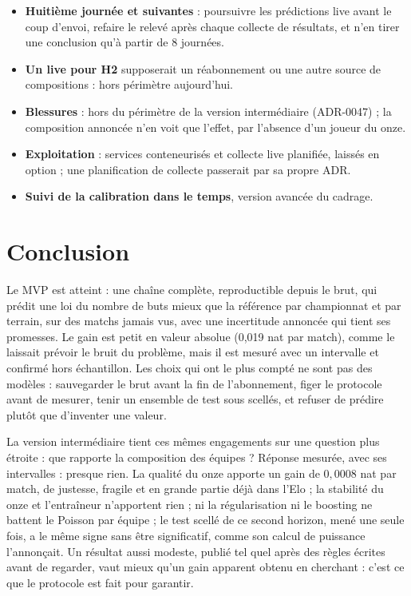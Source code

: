 \begin{itemize}
  \item \textbf{Huitième journée et suivantes} : poursuivre les prédictions live avant le coup d'envoi,
        refaire le relevé après chaque collecte de résultats, et n'en tirer une conclusion qu'à partir de
        8 journées.
  \item \textbf{Un live pour H2} supposerait un réabonnement ou une autre source de compositions : hors
        périmètre aujourd'hui.
  \item \textbf{Blessures} : hors du périmètre de la version intermédiaire (ADR-0047) ; la composition
        annoncée n'en voit que l'effet, par l'absence d'un joueur du onze.
  \item \textbf{Exploitation} : services conteneurisés et collecte live planifiée, laissés en option ; une
        planification de collecte passerait par sa propre ADR.
  \item \textbf{Suivi de la calibration dans le temps}, version avancée du cadrage.
\end{itemize}

\section{Conclusion}

Le MVP est atteint : une chaîne complète, reproductible depuis le brut, qui prédit une loi du nombre de
buts mieux que la référence par championnat et par terrain, sur des matchs jamais vus, avec une
incertitude annoncée qui tient ses promesses. Le gain est petit en valeur absolue (0,019 nat par match),
comme le laissait prévoir le bruit du problème, mais il est mesuré avec un intervalle et confirmé hors
échantillon. Les choix qui ont le plus compté ne sont pas des modèles : sauvegarder le brut avant la fin
de l'abonnement, figer le protocole avant de mesurer, tenir un ensemble de test sous scellés, et refuser
de prédire plutôt que d'inventer une valeur.

La version intermédiaire tient ces mêmes engagements sur une question plus étroite : que rapporte la
composition des équipes ? Réponse mesurée, avec ses intervalles : presque rien. La qualité du onze apporte
un gain de \(0{,}0008\) nat par match, de justesse, fragile et en grande partie déjà dans l'Elo ; la
stabilité du onze et l'entraîneur n'apportent rien ; ni la régularisation ni le boosting ne battent le
Poisson par équipe ; le test scellé de ce second horizon, mené une seule fois, a le même signe sans être
significatif, comme son calcul de puissance l'annonçait. Un résultat aussi modeste, publié tel quel après
des règles écrites avant de regarder, vaut mieux qu'un gain apparent obtenu en cherchant : c'est ce que le
protocole est fait pour garantir.
